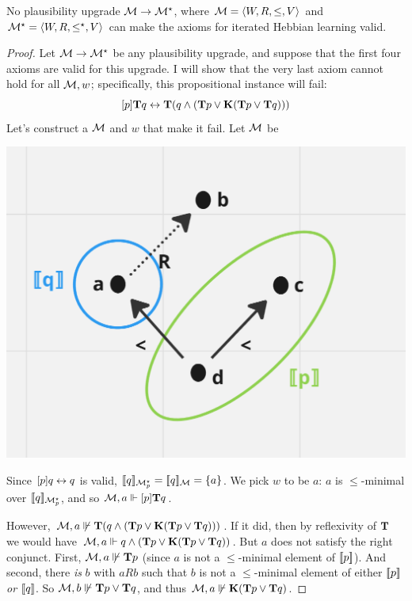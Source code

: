 \documentclass[letterpaper]{article}
\begin{document}
\begin{proposition}
    No plausibility upgrade $\mathcal{M} \to \mathcal{M}^\star$,  where $\mathcal{M} = \langle W, R, \leq, V \rangle$ and $\mathcal{M}^\star = \langle W, R, \leq^\star, V \rangle$ can make the axioms for iterated Hebbian learning valid.
\end{proposition}
\begin{proof}
    Let $\mathcal{M} \to \mathcal{M}^\star$ be any plausibility upgrade, and suppose that the first four axioms are valid for this upgrade.  I will show that the very last axiom cannot hold for all $\mathcal{M}, w$; specifically, this propositional instance will fail:
    \[
        [p] \textrm{\textup{\textbf{T}}} q \leftrightarrow 
        \textrm{\textup{\textbf{T}}} (q \land (\textrm{\textup{\textbf{T}}} p \lor \textrm{\textup{\textbf{K}}} (\textrm{\textup{\textbf{T}}} p \lor \textrm{\textup{\textbf{T}}} q)))
    \]
    Let's construct a $\mathcal{M}$ and $w$ that make it fail.  Let $\mathcal{M}$ be

    \begin{center}
    \includegraphics[scale=0.2]{4-22-24-mockup.png}
    \end{center}

    Since $[p] q \leftrightarrow q$ is valid, $[\![\mbox{\em $ q $\/}]\!]_{\mathcal{M}^\star_p} = [\![\mbox{\em $ q $\/}]\!]_{\mathcal{M}} = \{ a \}$.  We pick $w$ to be $a$: $a$ is $\leq$-minimal over $[\![\mbox{\em $ q $\/}]\!]_{\mathcal{M}^\star_p}$, and so $\mathcal{M}, a \Vdash [p] \textrm{\textup{\textbf{T}}} q$.
    
    However, $\mathcal{M}, a \not \Vdash \textrm{\textup{\textbf{T}}} (q \land (\textrm{\textup{\textbf{T}}} p \lor \textrm{\textup{\textbf{K}}} (\textrm{\textup{\textbf{T}}} p \lor \textrm{\textup{\textbf{T}}} q)))$.  If it did, then by reflexivity of $\Typ$ we would have $\mathcal{M}, a \Vdash q \land (\textrm{\textup{\textbf{T}}} p \lor \textrm{\textup{\textbf{K}}} (\textrm{\textup{\textbf{T}}} p \lor \textrm{\textup{\textbf{T}}} q))$.  But $a$ does not satisfy the right conjunct.  First, $\mathcal{M}, a \not \Vdash \textrm{\textup{\textbf{T}}} p$ (since $a$ is not a $\leq$-minimal element of $[\![\mbox{\em $ p $\/}]\!]$).  And second, there \emph{is} $b$ with $a{R}b$ such that $b$ is not a $\leq$-minimal element of either $[\![\mbox{\em $ p $\/}]\!]$ \emph{or} $[\![\mbox{\em $ q $\/}]\!]$.  So $\mathcal{M}, b \not \Vdash \textrm{\textup{\textbf{T}}} p \lor \textrm{\textup{\textbf{T}}} q$, and thus $\mathcal{M}, a \not \Vdash \textrm{\textup{\textbf{K}}} (\textrm{\textup{\textbf{T}}} p \lor \textrm{\textup{\textbf{T}}} q)$. \qedhere
\end{proof}
\end{document}
